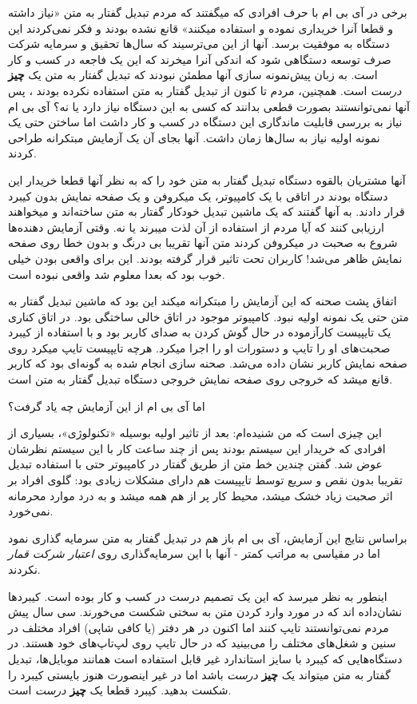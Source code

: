 برخی در آی بی ام با حرف افرادی که میگفتند که مردم تبدیل گفتار به متن
«نیاز داشته و قطعا آنرا خریداری نموده و استفاده میکنند» قانع نشده بودند
و فکر نمی‌کردند این دستگاه به موفقیت برسد. آنها از این می‌ترسیند که
سال‌ها تحقیق و سرمایه شرکت صرف توسعه دستگاهی شود که اندکی آنرا میخرند که
این یک فاجعه در کسب و کار است. به زبان پیش‌نمونه سازی آنها مطمئن نبودند
که تبدیل گفتار به متن یک \textbf{چیز} \emph{درست} است. همچنین، مردم تا
کنون از تبدیل گفتار به متن استفاده نکرده بودند ، پس آنها نمی‌توانستند
بصورت قطعی بدانند که کسی به این دستگاه نیاز دارد یا نه؟ آی بی ام نیاز به
بررسی قابلیت ماندگاری این دستگاه در کسب و کار داشت اما ساختن حتی یک
نمونه اولیه نیاز به سال‌ها زمان داشت. آنها بجای آن یک آزمایش مبتکرانه
طراحی کردند.

آنها مشتریان بالقوه دستگاه تبدیل گفتار به متن خود را که به نظر آنها قطعا
خریدار این دستگاه بودند در اتاقی با یک کامپیوتر، یک میکروفن و یک صفحه
نمایش بدون کیبرد قرار دادند. به آنها گفتند که یک ماشین تبدیل خودکار
گفتار به متن ساخته‌اند و میخواهند ارزیابی کنند که آیا مردم از استفاده از
آن لذت میبرند یا نه. وقتی آزمایش دهنده‌ها شروع به صحبت در میکروفن کردند
متن آنها تقریبا بی درنگ و بدون خطا روی صفحه نمایش ظاهر می‌شد! کاربران
تحت تاثیر قرار گرفته بودند. این برای واقعی بودن خیلی خوب بود که بعدا
معلوم شد واقعی نبوده است.

اتفاق پشت صحنه که این آزمایش را مبتکرانه میکند این بود که ماشین تبدیل
گفتار به متن حتی یک نمونه اولیه نبود. کامپیوتر موجود در اتاق خالی ساختگی
بود. در اتاق کناری یک تایپیست کارآزموده در حال گوش کردن به صدای کاربر
بود و با استفاده از کیبرد صحبت‌های او را تایپ و دستورات او را اجرا
میکرد. هرچه تایپیست تایپ میکرد روی صفحه نمایش کاربر نشان داده می‌شد.
صحنه سازی انجام شده به گونه‌ای بود که کاربر قانع میشد که خروجی روی صفحه
نمایش خروجی دستگاه تبدیل گفتار به متن است.

اما آی بی ام از این آزمایش چه یاد گرفت؟

این چیزی است که من شنیده‌ام: بعد از تاثیر اولیه بوسیله «تکنولوژی»،
بسیاری از افرادی که خریدار این سیستم بودند پس از چند ساعت کار با این
سیستم نظرشان عوض شد. گفتن چندین خط متن از طریق گفتار در کامپیوتر حتی با
استفاده تبدیل تقریبا بدون نقص و سریع توسط تایپیست هم دارای مشکلات زیادی
بود: گلوی افراد بر اثر صحبت زیاد خشک میشد، محیط کار پر از هم همه میشد و
به درد موارد محرمانه نمی‌خورد.

براساس نتایج این آزمایش، آی بی ام باز هم در تبدیل گفتار به متن سرمایه
گذاری نمود اما در مقیاسی به مراتب کمتر - آنها با این سرمایه‌گذاری روی
\emph{اعتبار شرکت قمار} نکردند.

اینطور به نظر میرسد که این یک تصمیم درست در کسب و کار بوده است. کیبردها
نشان‌داده اند که در مورد وارد کردن متن به سختی شکست می‌خورند. سی سال پیش
مردم نمی‌توانستند تایپ کنند اما اکنون در هر دفتر (یا کافی شاپی) افراد
مختلف در سنین و شغل‌های مختلف را می‌بینید که در حال تایپ روی لپ‌تاپ‌های
خود هستند. در دستگاه‌هایی که کیبرد با سایز استاندارد غیر قابل استفاده
است همانند موبایل‌ها، تبدیل گفتار به متن میتواند یک \textbf{چیز}
\emph{درست} باشد اما در غیر اینصورت هنوز بایستی کیبرد را شکست بدهید.
کیبرد قطعا یک \textbf{چیز} \emph{درست} است.

